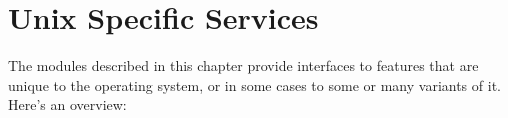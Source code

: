 \chapter{Unix Specific Services}
\label{unix}

The modules described in this chapter provide interfaces to features
that are unique to the \UNIX{} operating system, or in some cases to
some or many variants of it.  Here's an overview:

\localmoduletable
